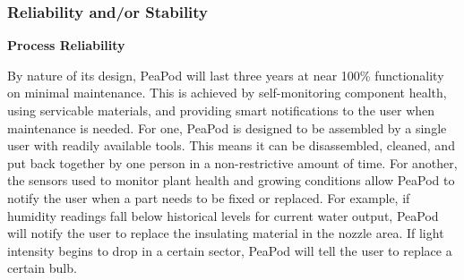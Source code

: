 \documentclass{report}
\begin{document}





\subsubsection{Reliability and/or Stability}

\textbf{Process Reliability}
\label{sec:reliability-process}






By nature of its design, PeaPod will last three years at near 100\% functionality on minimal maintenance.
This is achieved by self-monitoring component health, using servicable materials, and providing smart notifications to the user when maintenance is needed.
For one, PeaPod is designed to be assembled by a single user with readily available tools. This means it can be disassembled, cleaned, and put back together by one person in a non-restrictive amount of time.
For another, the sensors used to monitor plant health and growing conditions allow PeaPod to notify the user when a part needs to be fixed or replaced. For example, if humidity readings fall below historical levels for current water output, PeaPod will notify the user to replace the insulating material in the nozzle area. If light intensity begins to drop in a certain sector, PeaPod will tell the user to replace a certain bulb.
\end{document}
